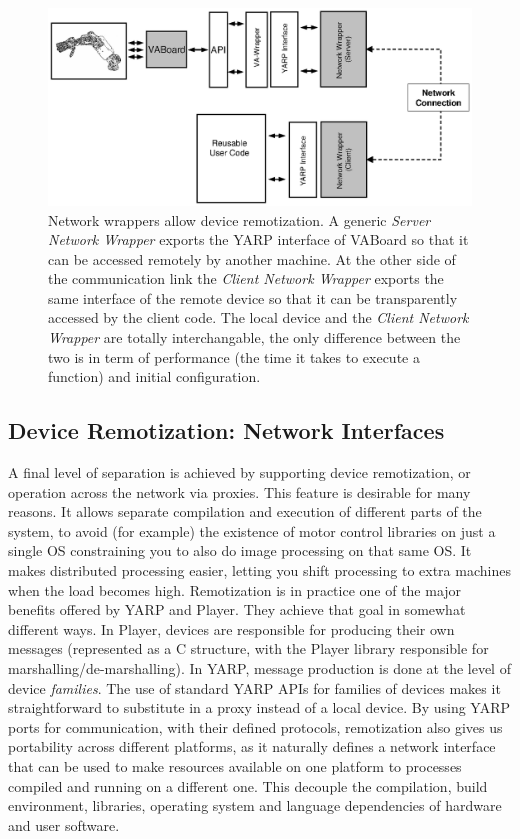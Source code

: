 \begin{figure}[tbp]
\centerline{
\includegraphics[width=24cm]{fig-devices3}
}
\caption{Network wrappers allow device remotization. A generic 
\emph{Server Network Wrapper} exports the YARP interface of VABoard so 
that it can be accessed remotely by another machine. At the 
other side of the 
communication link the \emph{Client Network Wrapper} exports the same 
interface of the remote device so that it can be transparently accessed 
by the client code. The local device and the \emph{Client Network Wrapper}
 are totally interchangable, the only difference between the two is in 
term of performance (the time it takes to execute a function) and
initial configuration.
}\label{fig:devices3}
\end{figure}


\subsection{Device Remotization: Network Interfaces}
%
A final level of separation is achieved by supporting device remotization,
or operation across the network via proxies.
This feature is desirable for many reasons. It 
allows separate compilation and
execution of different parts of the system, to avoid (for example)
 the existence of motor control libraries on just a single OS
constraining you to also do image processing on that same OS.
It makes distributed processing easier, letting you shift
processing to extra machines when the load becomes high.
%
Remotization is in practice one of the major benefits offered by
YARP and Player.  They achieve that goal in somewhat different ways.
In Player, devices are responsible for producing their own messages
(represented as a C structure, with the Player library responsible for
marshalling/de-marshalling).
%
In YARP, message production is done at the level of device {\it families}.
%
The use of standard YARP APIs for families of devices
makes it straightforward to substitute in a proxy
instead of a local device.
%
%
By using YARP ports for communication, with their defined protocols,
remotization also gives us portability across different platforms, as 
it naturally defines a network interface that can 
be used to make resources available on one platform to processes compiled 
and running on a different one. This decouple the compilation, build 
environment, libraries, operating system and language dependencies of 
hardware and user software.

